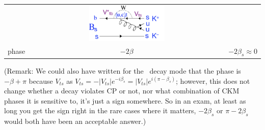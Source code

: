 \begin{enumerate}[a)]
{\begin{tabular}{ccc}
&\includegraphics[width=0.4\textwidth]{problemsheets/ps4figs/Bs2KKpeng}\\
phase & $-2\beta$ & $-2\beta_s \approx 0$
\end{tabular}
(Remark: We could also have written for the \Bso\ decay mode that the phase is $-\beta + \pi$ because $V_{ts}$ as $V_{ts} = -|V_{ts}| e^{-i\beta_s} = |V_{ts}| e^{i(\pi -\beta_s)}$; however, this does not change whether a decay violates CP or not, nor what combination of CKM phases it is sensitive to, it's just a sign somewhere. So in an exam, at least as long you get the sign right in the rare cases where it matters, $-2\beta_s$ or $\pi - 2\beta_s$ would both have been an acceptable answer.)
}
\end{enumerate}
